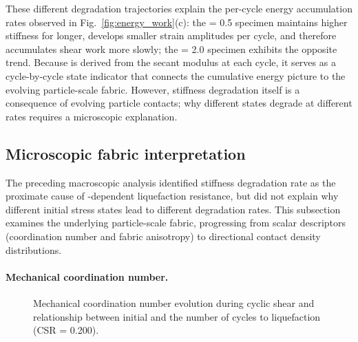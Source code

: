 These different degradation trajectories explain the per-cycle energy accumulation rates observed in Fig.~\ref{fig:energy_work}(c): the \Kzero{} = 0.5 specimen maintains higher stiffness for longer, develops smaller strain amplitudes per cycle, and therefore accumulates shear work more slowly; the \Kzero{} = 2.0 specimen exhibits the opposite trend. Because \Vs{} is derived from the secant modulus at each cycle, it serves as a cycle-by-cycle state indicator that connects the cumulative energy picture to the evolving particle-scale fabric. However, stiffness degradation itself is a consequence of evolving particle contacts; why different \Kzero{} states degrade at different rates requires a microscopic explanation.

\subsection{Microscopic fabric interpretation}
\label{subsec:micro_fabric_results}

The preceding macroscopic analysis identified stiffness degradation rate as the proximate cause of \Kzero{}-dependent liquefaction resistance, but did not explain why different initial stress states lead to different degradation rates. This subsection examines the underlying particle-scale fabric, progressing from scalar descriptors (coordination number and fabric anisotropy) to directional contact density distributions.

\paragraph{Mechanical coordination number.}

\begin{figure}
  \centering
  \caption{Mechanical coordination number evolution during cyclic shear and relationship between initial \Zm{} and the number of cycles to liquefaction (CSR = 0.200).}
  \label{fig:zm_evolution}
\end{figure}


